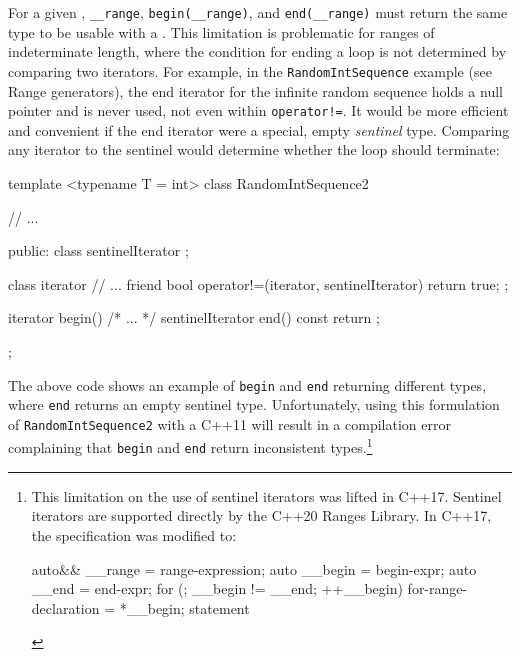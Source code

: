 {{{For a given , \lstinline!__range!,
\lstinline!begin(__range)!, and \lstinline!end(__range)! must return the
same type to be usable with a .
This limitation is problematic for ranges of indeterminate length, where
the condition for ending a loop is not determined by comparing two
iterators. For example, in the \lstinline!RandomIntSequence! example (see
{Range generators}), the end iterator for the infinite random sequence
holds a null pointer and is never used, not even within
\lstinline|operator!=|. It would be more efficient and convenient if the
end iterator were a special, empty \emph{sentinel} type. Comparing any
iterator to the sentinel would determine whether the loop should
terminate:

\begin{emcppslisting}
template <typename T = int>
class RandomIntSequence2
{
    // ...

public:
    class sentinelIterator { };

    class iterator {
        // ...
        friend bool operator!=(iterator, sentinelIterator) { return true; }
    };

    iterator         begin() { /* ... */ }
    sentinelIterator end() const { return {}; }
};
\end{emcppslisting}


\noindent The above code shows an example of \lstinline!begin! and \lstinline!end!
returning different types, where \lstinline!end! returns an empty sentinel
type. Unfortunately, using this formulation of
\lstinline!RandomIntSequence2!\linebreak[4]\newpage
with a C++11  will result in a compilation error complaining that
\lstinline!begin! and \lstinline!end! return inconsistent
types.{\cprotect\footnote{This limitation on the use of sentinel
iterators was lifted in C++17. Sentinel iterators are supported
directly by the C++20 Ranges Library. In C++17, the specification was
modified to:

\begin{emcppslisting}[style=footcode,emcppsignore={grammar, not code, but leave as c++}]
{
    auto&& __range = range-expression;
    auto __begin   = begin-expr;
    auto __end     = end-expr;
    for (; __begin != __end; ++__begin)
    {
        for-range-declaration = *__begin;
        statement
    }
}
\end{emcppslisting}
      }}

}}}
